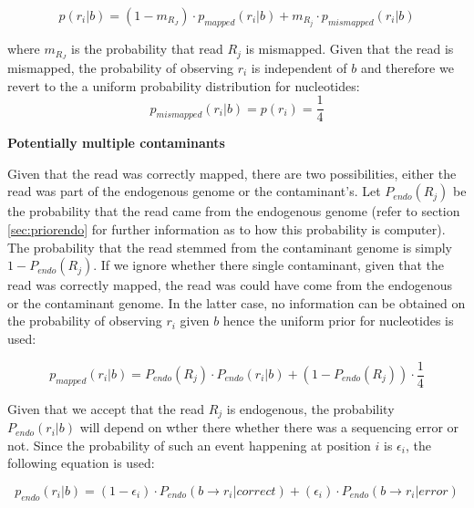 \documentclass[a4paper,12pt]{article}
\begin{document}
\begin{equation}
  p(r_i|b)   =  (1-m_{R_J}) \cdot p_{mapped}(r_i|b) + m_{R_j} \cdot p_{mismapped}(r_i|b) 
\end{equation} 

\noindent where $m_{R_J}$ is the probability that read $R_j$ is mismapped. Given that the read is mismapped, the probability of observing $r_i$ is independent of $b$ and therefore we revert to the a uniform probability distribution for nucleotides:
\begin{equation}
  p_{mismapped}(r_i|b)   =  p(r_i) =     \frac{ 1} {4} 
\label{eqn:mismapped}
\end{equation} 



{\bf Potentially multiple contaminants}


Given that the read was correctly mapped, there are two possibilities, either the read was part of the endogenous genome or the contaminant's. Let $P_{endo}(R_j)$ be the probability that the read came from the endogenous genome (refer to section \ref{sec:priorendo} for further information as to how this probability is computer). The probability that the read stemmed from the contaminant genome is simply $1-P_{endo}(R_j)$. If we ignore whether there single contaminant, given that the read was correctly mapped, the read was could have come from the endogenous or the contaminant genome. In the latter case, no information can be obtained on the probability of observing $r_i$ given $b$ hence the uniform prior for nucleotides is used:

\begin{equation}
p_{mapped}(r_i|b) =  P_{endo}(R_j) \cdot P_{endo} (r_i|b)   + (1-P_{endo}(R_j)) \cdot \frac {1} {4}
\label{eqn:correctmap}
\end{equation}

\noindent Given that we accept that the read $R_j$ is endogenous, the probability $P_{endo} (r_i|b)$ will depend on wther there whether there was a sequencing error or not. Since the probability of such an event happening at position $i$ is $\epsilon_i$, the following equation is used:

\begin{equation}
  p_{endo}(r_i|b)   =  (1-\epsilon_i ) \cdot  P_{endo}( b \to r_i|correct) +  (\epsilon_i) \cdot P_{endo}(  b \to r_i |error)   
  \label{eqn:match}
\end{equation} 
\end{document}
